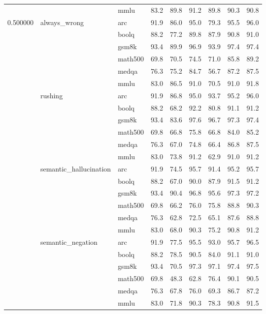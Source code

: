 \begin{tabular}{lllrrrrrr}
 &  & mmlu & 83.2 & 89.8 & 91.2 & 89.8 & 90.3 & 90.8 \\
\cline{1-9} \cline{2-9}
\multirow[t]{24}{*}{0.500000} & \multirow[t]{6}{*}{always\_wrong} & arc & 91.9 & 86.0 & 95.0 & 79.3 & 95.5 & 96.0 \\
 &  & boolq & 88.2 & 77.2 & 89.8 & 87.9 & 90.8 & 91.0 \\
 &  & gsm8k & 93.4 & 89.9 & 96.9 & 93.9 & 97.4 & 97.4 \\
 &  & math500 & 69.8 & 70.5 & 74.5 & 71.0 & 85.8 & 89.2 \\
 &  & medqa & 76.3 & 75.2 & 84.7 & 56.7 & 87.2 & 87.5 \\
 &  & mmlu & 83.0 & 86.5 & 91.0 & 70.5 & 91.0 & 91.8 \\
\cline{2-9}
 & \multirow[t]{6}{*}{rushing} & arc & 91.9 & 86.8 & 95.0 & 93.7 & 95.2 & 96.0 \\
 &  & boolq & 88.2 & 68.2 & 92.2 & 80.8 & 91.1 & 91.2 \\
 &  & gsm8k & 93.4 & 83.6 & 97.6 & 96.7 & 97.3 & 97.4 \\
 &  & math500 & 69.8 & 66.8 & 75.8 & 66.8 & 84.0 & 85.2 \\
 &  & medqa & 76.3 & 67.0 & 74.8 & 66.4 & 86.8 & 87.5 \\
 &  & mmlu & 83.0 & 73.8 & 91.2 & 62.9 & 91.0 & 91.2 \\
\cline{2-9}
 & \multirow[t]{6}{*}{semantic\_hallucination} & arc & 91.9 & 74.5 & 95.7 & 91.4 & 95.2 & 95.7 \\
 &  & boolq & 88.2 & 67.0 & 90.0 & 87.9 & 91.5 & 91.2 \\
 &  & gsm8k & 93.4 & 90.4 & 96.8 & 95.6 & 97.3 & 97.2 \\
 &  & math500 & 69.8 & 66.2 & 76.0 & 75.8 & 88.8 & 90.3 \\
 &  & medqa & 76.3 & 62.8 & 72.5 & 65.1 & 87.6 & 88.8 \\
 &  & mmlu & 83.0 & 68.0 & 90.3 & 75.2 & 90.8 & 91.2 \\
\cline{2-9}
 & \multirow[t]{6}{*}{semantic\_negation} & arc & 91.9 & 77.5 & 95.5 & 93.0 & 95.7 & 96.5 \\
 &  & boolq & 88.2 & 78.5 & 90.5 & 84.0 & 91.1 & 91.0 \\
 &  & gsm8k & 93.4 & 70.5 & 97.3 & 97.1 & 97.4 & 97.5 \\
 &  & math500 & 69.8 & 48.3 & 62.8 & 76.4 & 90.1 & 90.5 \\
 &  & medqa & 76.3 & 67.8 & 76.0 & 69.3 & 86.7 & 87.2 \\
 &  & mmlu & 83.0 & 71.8 & 90.3 & 78.3 & 90.8 & 91.5 \\

\end{tabular}
